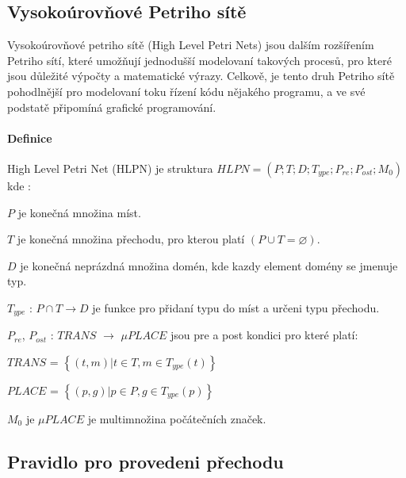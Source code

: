 \subsection{Vysokoúrovňové Petriho sítě}
\label{subsec:hlpn}
Vysokoúrovňové petriho sítě (High Level Petri Nets) jsou dalším rozšířením Petriho sítí, které umožňují jednodušší modelovaní takových procesů, pro které jsou důležité výpočty a matematické výrazy. Celkově, je tento druh Petriho sítě pohodlnější pro modelovaní toku řízení kódu nějakého programu, a ve své podstatě připomíná grafické programování.

\paragraph{Definice}

High Level Petri Net (HLPN) je struktura $HLPN = \left( P; T; D; T_{ype}; P_{re}; P_{ost}; M_0\right) $ kde \cite[p.11--12]{pnstd54}:

\begin{itemize}
  \item $P$ je konečná množina míst. \\
  \item $T$ je konečná množina přechodu, pro kterou platí $\left(P \cup T = \varnothing\right)$. \\
  \item $D$ je konečná neprázdná množina domén, kde kazdy element domény se jmenuje typ. \\
  \item $T_{ype}$ : $P \cap T \rightarrow D$ je funkce pro přidaní typu do míst a určeni typu přechodu.
  \item $P_{re}$, $P_{ost}$ : $TRANS$ $\rightarrow$ $\mu PLACE$ jsou pre a post kondici pro které platí: \\
  \begin{center}
    \item $TRANS$ = $\left\{\left(t, m\right) | t \in T, m \in T_{ype} \left( t \right)\right\}$ \\
    \item $PLACE$ = $\left\{\left(p, g\right) | p \in P, g \in T_{ype} \left( p \right)\right\}$ \\
  \end{center}
  \item $M_0$ je $\mu PLACE$ je multimnožina počátečních značek.
\end{itemize}

\subsection{Pravidlo pro provedeni přechodu}
\label{subsec:graph-transition}

